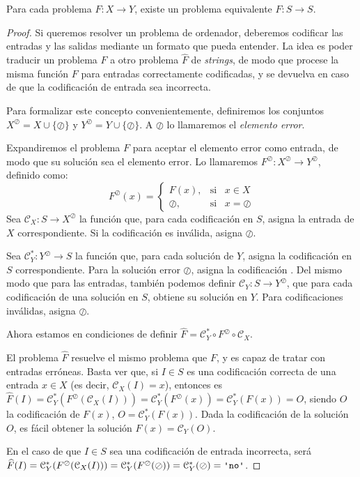 \begin{proposicion}\label{prop:f-s}
Para cada problema $F:X\longrightarrow Y$, existe un problema equivalente $\widehat{F}:S\longrightarrow S$.
\end{proposicion}
\begin{proof}
Si queremos resolver un problema de ordenador, deberemos codificar las entradas y las salidas mediante un formato que pueda entender. La idea es poder traducir un problema $F$ a otro problema $\widehat{F}$ de \emph{strings}, de modo que procese la misma función $F$ para entradas correctamente codificadas, y se devuelva  en caso de que la codificación de entrada sea incorrecta.

Para formalizar este concepto convenientemente, definiremos los conjuntos $X^\oslash = X \cup \{\oslash\}$ y $Y^\oslash = Y \cup \{\oslash\}$. A $\oslash$ lo llamaremos el \emph{elemento error}.

Expandiremos el problema $F$ para aceptar el elemento error como entrada, de modo que su solución sea el elemento error. Lo llamaremos $F^\oslash : X^\oslash \longrightarrow Y^\oslash$, definido como:
$$
    F^\oslash(x) = \begin{cases} 
      F(x), & \text{si} \;\;\; x \in X \\
      \oslash, & \text{si} \;\;\; x = \oslash 
   \end{cases}
$$
Sea $\mathcal{C}_X : S \longrightarrow X^\oslash$ la función que, para cada codificación en $S$, asigna la entrada de $X$ correspondiente. Si la codificación es inválida, asigna $\oslash$.

Sea $\mathcal{C}_Y^* : Y^\oslash \longrightarrow S$ la función que, para cada solución de $Y$, asigna la codificación en $S$ correspondiente. Para la solución error $\oslash$, asigna la codificación . Del mismo modo que para las entradas, también podemos definir $\mathcal{C}_Y : S \longrightarrow Y^\oslash$, que para cada codificación de una solución en $S$, obtiene su solución en $Y$. Para codificaciones inválidas, asigna $\oslash$.

Ahora estamos en condiciones de definir $\widehat{F} = \mathcal{C}_Y^* \circ F^\oslash \circ \mathcal{C}_X$.
\begin{figure}[H]
\centering

\end{figure}
El problema $\widehat{F}$ resuelve el mismo problema que $F$, y es capaz de tratar con entradas erróneas. Basta ver que, si $I\in S$ es una codificación correcta de una entrada $x\in X$ (es decir, $\mathcal{C}_X(I)=x$), entonces es $\widehat{F}(I) = \mathcal{C}_Y^*(F^\oslash(\mathcal{C}_X(I))) = \mathcal{C}_Y^*(F^\oslash(x)) = \mathcal{C}_Y^*(F(x)) = O$, siendo $O$ la codificación de $F(x)$, $O=\mathcal{C}_Y^*(F(x))$. Dada la codificación de la solución $O$, es fácil obtener la solución $F(x) = \mathcal{C}_Y(O)$.

En el caso de que $I \in S$ sea una codificación de entrada incorrecta, será $\widehat{F}(I)=\mathcal{C}_Y^*(F^\oslash(\mathcal{C}_X(I)))=\mathcal{C}_Y^*(F^\oslash(\oslash))=\mathcal{C}_Y^*(\oslash)=\palabra{no}$.
\end{proof}

